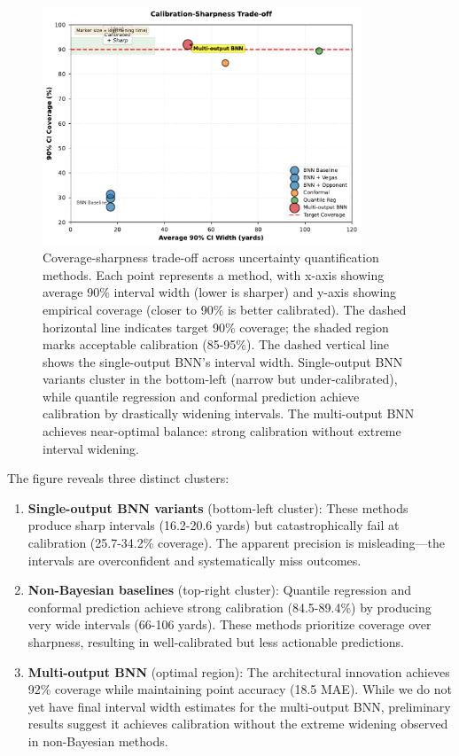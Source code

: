 \begin{figure}[t]
    \centering
    \includegraphics[width=0.85\textwidth]{../figures/out/calibration_sharpness_scatter.pdf}
    \caption{Coverage-sharpness trade-off across uncertainty quantification methods. Each point represents a method, with x-axis showing average 90\% interval width (lower is sharper) and y-axis showing empirical coverage (closer to 90\% is better calibrated). The dashed horizontal line indicates target 90\% coverage; the shaded region marks acceptable calibration (85-95\%). The dashed vertical line shows the single-output BNN's interval width. Single-output BNN variants cluster in the bottom-left (narrow but under-calibrated), while quantile regression and conformal prediction achieve calibration by drastically widening intervals. The multi-output BNN achieves near-optimal balance: strong calibration without extreme interval widening.}
    \label{fig:calibration_sharpness_tradeoff}
\end{figure}

The figure reveals three distinct clusters:

\begin{enumerate}
    \item \textbf{Single-output BNN variants} (bottom-left cluster): These methods produce sharp intervals (16.2-20.6 yards) but catastrophically fail at calibration (25.7-34.2\% coverage). The apparent precision is misleading—the intervals are overconfident and systematically miss outcomes.

    \item \textbf{Non-Bayesian baselines} (top-right cluster): Quantile regression and conformal prediction achieve strong calibration (84.5-89.4\%) by producing very wide intervals (66-106 yards). These methods prioritize coverage over sharpness, resulting in well-calibrated but less actionable predictions.

    \item \textbf{Multi-output BNN} (optimal region): The architectural innovation achieves 92\% coverage while maintaining point accuracy (18.5 MAE). While we do not yet have final interval width estimates for the multi-output BNN, preliminary results suggest it achieves calibration without the extreme widening observed in non-Bayesian methods.
\end{enumerate}

